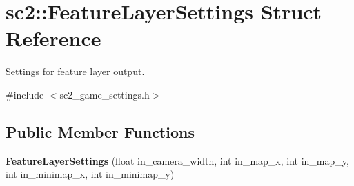 \hypertarget{structsc2_1_1_feature_layer_settings}{}\section{sc2\+:\+:Feature\+Layer\+Settings Struct Reference}
\label{structsc2_1_1_feature_layer_settings}


Settings for feature layer output.  




{\ttfamily \#include $<$sc2\+\_\+game\+\_\+settings.\+h$>$}

\subsection*{Public Member Functions}
\begin{DoxyCompactItemize}
\item 
\mbox{\label{structsc2_1_1_feature_layer_settings_a28f19d96438d2be327a29850de68a662}} 
{\bfseries Feature\+Layer\+Settings} (float in\+\_\+camera\+\_\+width, int in\+\_\+map\+\_\+x, int in\+\_\+map\+\_\+y, int in\+\_\+minimap\+\_\+x, int in\+\_\+minimap\+\_\+y)
\end{DoxyCompactItemize}
